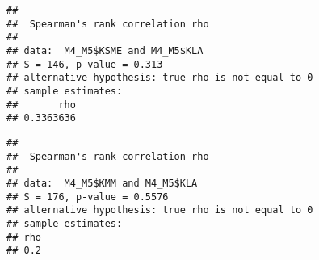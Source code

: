 \documentclass[]{article}
\newenvironment{Shaded}{\begin{snugshade}}{\end{snugshade}}
\newcommand{\KeywordTok}[1]{\textcolor[rgb]{0.13,0.29,0.53}{\textbf{{#1}}}}
\newcommand{\DataTypeTok}[1]{\textcolor[rgb]{0.13,0.29,0.53}{{#1}}}
\newcommand{\StringTok}[1]{\textcolor[rgb]{0.31,0.60,0.02}{{#1}}}
\newcommand{\OtherTok}[1]{\textcolor[rgb]{0.56,0.35,0.01}{{#1}}}
\newcommand{\NormalTok}[1]{{#1}}
\begin{document}
\begin{verbatim}
## 
##  Spearman's rank correlation rho
## 
## data:  M4_M5$KSME and M4_M5$KLA
## S = 146, p-value = 0.313
## alternative hypothesis: true rho is not equal to 0
## sample estimates:
##       rho 
## 0.3363636
\end{verbatim}

\begin{Shaded}
\end{Shaded}

\begin{verbatim}
## 
##  Spearman's rank correlation rho
## 
## data:  M4_M5$KMM and M4_M5$KLA
## S = 176, p-value = 0.5576
## alternative hypothesis: true rho is not equal to 0
## sample estimates:
## rho 
## 0.2
\end{verbatim}
\end{document}
